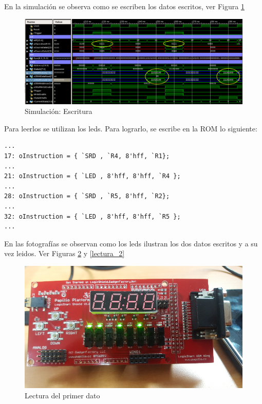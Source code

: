 \documentclass[10pt]{article}
\begin{document}
En la simulación se observa como se escriben los datos escritos, ver Figura \ref{sim_escritura}

\begin{figure}[hbtp]
\centering
\includegraphics[width=1\textwidth]{escritura.png}
\caption{Simulación: Escritura}
\label{sim_escritura}
\end{figure}

Para leerlos se utilizan los leds. Para lograrlo, se escribe en la ROM lo siguiente:

\begin{lstlisting}
...
17: oInstruction = { `SRD , `R4, 8'hff, `R1};
...
21: oInstruction = { `LED , 8'hff, 8'hff, `R4 };
...
28: oInstruction = { `SRD , `R5, 8'hff, `R2};
...
32: oInstruction = { `LED , 8'hff, 8'hff, `R5 };
...
\end{lstlisting}

En las fotografías se observan como los leds ilustran los dos datos escritos y a su vez leidos. Ver Figuras \ref{lectura_1} y \ref{lectura_2}

\begin{figure}[hbtp]
\centering
\includegraphics[width=1\textwidth]{lecturaa.jpg}
\caption{Lectura del primer dato}
\label{lectura_1}
\end{figure}
\end{document}
